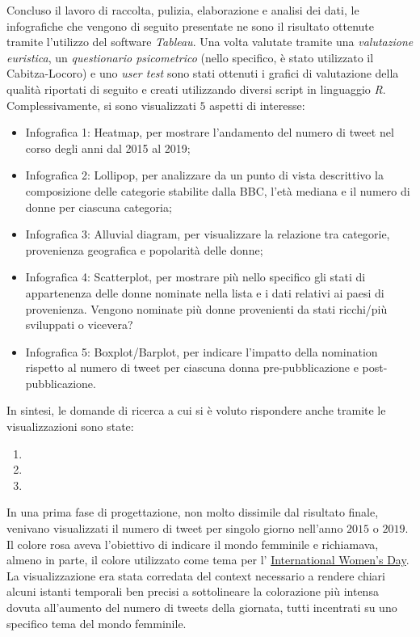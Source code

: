 \documentclass[11pt, a4paper]{report}
\begin{document}
	Concluso il lavoro di raccolta, pulizia, elaborazione e analisi dei dati, le infografiche che vengono di seguito presentate ne sono il risultato ottenute tramite l'utilizzo del software \textit{Tableau}. Una volta valutate tramite una \textit{valutazione euristica}, un \textit{questionario psicometrico} (nello specifico, è stato utilizzato il Cabitza-Locoro) e uno \textit{user test} sono stati ottenuti i grafici di valutazione della qualità riportati di seguito e creati utilizzando diversi script in linguaggio \textit{R}. \\
	
	Complessivamente, si sono visualizzati $ 5 $ aspetti di interesse:
	
	\begin{itemize}
		\item Infografica 1: Heatmap, per mostrare l'andamento del numero di tweet nel corso degli anni dal 2015 al 2019;
		\item Infografica 2: Lollipop, per analizzare da un punto di vista descrittivo la composizione delle categorie stabilite dalla BBC, l'età mediana e il numero di donne per ciascuna categoria;
		\item Infografica 3: Alluvial diagram, per visualizzare la relazione tra categorie, provenienza geografica e popolarità delle donne;
		\item Infografica 4: Scatterplot, per mostrare più nello specifico gli stati di appartenenza delle donne nominate nella lista e i dati relativi ai paesi di provenienza. Vengono nominate più donne provenienti da stati ricchi/più sviluppati o vicevera?
		\item Infografica 5: Boxplot/Barplot, per indicare l'impatto della nomination rispetto al numero di tweet per ciascuna donna pre-pubblicazione e post-pubblicazione.
	\end{itemize}
	
	In sintesi, le domande di ricerca a cui si è voluto rispondere anche tramite le visualizzazioni sono state:
	
	\begin{enumerate}
		\item 
		\item 
		\item 
	\end{enumerate}
	
	In una prima fase di progettazione, non molto dissimile dal risultato finale, venivano visualizzati il numero di tweet per singolo giorno nell'anno $ 2015 $ o $ 2019 $. Il colore rosa aveva l'obiettivo di indicare il mondo femminile e richiamava, almeno in parte, il colore utilizzato come tema per l' \href{https://www.internationalwomensday.com/}{International Women's Day}. La visualizzazione era stata corredata del context necessario a rendere chiari alcuni istanti temporali ben precisi a sottolineare la colorazione più intensa dovuta all'aumento del numero di tweets della giornata, tutti incentrati su uno specifico tema del mondo femminile.
	
\end{document}
